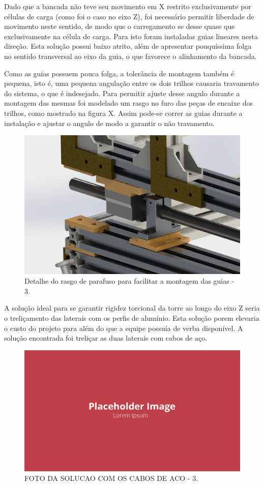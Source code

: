 Dado que a bancada não teve seu movimento em X restrito exclusivamente por células de carga (como foi o caso no eixo Z), foi necessário permitir liberdade de movimento neste sentido, de modo que o carregamento se desse quase que exclusivamente na célula de carga. Para isto foram instaladas guias lineares nesta direção. Esta solução possui baixo atrito, além de apresentar pouquíssima folga no sentido transversal ao eixo da guia, o que favorece o alinhamento da bancada.

Como as guias possuem pouca folga, a tolerância de montagem também é pequena, isto é, uma pequena angulação entre os dois trilhos causaria travamento do sistema, o que é indesejado. Para permitir ajuste desse angulo durante a montagem das mesmas foi modelado um rasgo no furo das peças de encaixe dos trilhos, como mostrado na figura X. Assim pode-se correr as guias durante a instalação e ajustar o angulo de modo a garantir o não travamento.

\begin{figure}[!ht]
    \centering
    \includegraphics[width=.8\linewidth]{figuras/renders/suporte_sk12_com_rasgo.png}
    \caption{Detalhe do rasgo de parafuso para facilitar a montagem das guias  - 3\cite{autor}.}
    \label{fig:rasgo_suporte_sk12}
\end{figure}

A solução ideal para se garantir rigidez torcional da torre ao longo do eixo Z seria o treliçamento das laterais com os perfis de alumínio. Esta solução porem elevaria o custo do projeto para além do que a equipe possuía de verba disponível. A solução encontrada foi treliçar as duas laterais com cabos de aço.

\begin{figure}[!ht]
    \centering
    \includegraphics[width=.8\linewidth]{figuras/outras/placeholder.png}
    \caption{FOTO DA SOLUCAO COM OS CABOS DE ACO - 3\cite{autor}.}
    \label{fig:placeholder}
\end{figure}

